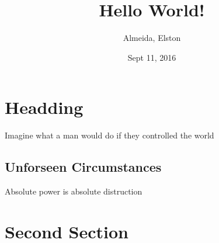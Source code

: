 \documentclass{article}
\title{Hello World!}
\date{Sept 11, 2016}
\author{Almeida, Elston}
\begin{document}
  

\maketitle

\newpage


\section{Headding}

Imagine what a man would do if they controlled the world

\subsection{Unforseen Circumstances}

Absolute power is absolute distruction

\section{Second Section}

\paragraph{}
\end{document}
